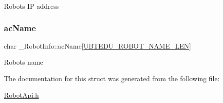 Robot\textquotesingle{}s IP address \mbox{\label{struct__RobotInfo_a0dc600adfbf72150e776f100d6ec80ad}} 
\subsubsection{\texorpdfstring{ac\+Name}{acName}}
{\footnotesize\ttfamily char \+\_\+\+Robot\+Info\+::ac\+Name\mbox{[}\hyperlink{RobotApi_8h_aa37c5da3aea28e1d6eb93c3950ac7afe}{U\+B\+T\+E\+D\+U\+\_\+\+R\+O\+B\+O\+T\+\_\+\+N\+A\+M\+E\+\_\+\+L\+EN}\mbox{]}}

Robot\textquotesingle{}s name 

The documentation for this struct was generated from the following file\+:\begin{DoxyCompactItemize}
\item 
\hyperlink{RobotApi_8h}{Robot\+Api.\+h}\end{DoxyCompactItemize}
